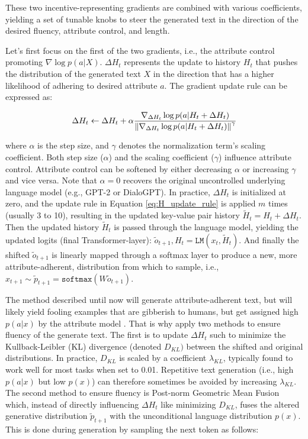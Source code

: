 These two incentive-representing gradients are combined with various coefficients, yielding a set of tunable knobs to steer the generated text in the direction of the desired fluency, attribute control, and length.

Let's first focus on the first of the two gradients, i.e., the attribute control promoting $\nabla \log p(a | X)$. $\Delta H_t$ represents the update to history $H_t$ that pushes the distribution of the generated text $X$ in the direction that has a higher likelihood of adhering to desired attribute $a$. The gradient update rule can be expressed as:

\begin{equation}
    \Delta H_t \leftarrow \Delta H_t + \alpha
    \frac{\nabla_{\Delta H_t} \log p(a | H_t + \Delta H_t)}
    {\norm{\nabla_{\Delta H_t} \log p(a | H_t + \Delta H_t)}^{\gamma}}
\label{eq:H_update_rule}
\end{equation}

where $\alpha$ is the step size, and $\gamma$ denotes the normalization term's scaling coefficient. Both step size ($\alpha$) and the scaling coefficient ($\gamma$) influence attribute control. Attribute control can be softened by either decreasing $\alpha$ or increasing $\gamma$ and vice versa. Note that $\alpha = 0$ recovers the original uncontrolled underlying language model (e.g., GPT-2 or DialoGPT). In practice, $\Delta H_t$ is initialized at zero, and the update rule in Equation \ref{eq:H_update_rule} is applied $m$ times (usually 3 to 10), resulting in the updated key-value pair history $\tilde{H}_t  = H_t + \Delta H_t$. Then the updated history $\tilde{H}_t$ is passed through the language model, yielding the updated logits (final Transformer-layer): $\tilde{o}_{t + 1}, H_t = \texttt{LM}(x_t, \tilde{H}_t)$. And finally the shifted $\tilde{o}_{t + 1}$ is linearly mapped through a softmax layer to produce a new, more attribute-adherent, distribution from which to sample, i.e., $x_{t + 1} \sim \tilde{p}_{t + 1} = \texttt{softmax} \left( W \tilde{o}_{t + 1} \right)$.

The method described until now will generate attribute-adherent text, but will likely yield fooling examples \citep{nguyen2015deep} that are gibberish to humans, but get assigned high $p(a | x)$ by the attribute model \citep{dathathri2019plug}. That is why \cite{dathathri2019plug} apply two methods to ensure fluency of the generate text. The first is to update $\Delta H_t$ such to minimize the Kullback-Leibler (KL) divergence (denoted $D_{KL})$ between the shifted and original distributions. In practice, $D_{KL}$ is scaled by a coefficient $\lambda_{KL}$, typically found to work well for most tasks when set to 0.01. Repetitive text generation (i.e., high $p(a | x)$ but low $p(x)$) can therefore sometimes be avoided by increasing $\lambda_{KL}$. The second method to ensure fluency is Post-norm Geometric Mean Fusion \citep{stahlberg-etal-2018-simple} which, instead of directly influencing $\Delta H_t$ like minimizing $D_{KL}$, fuses the altered generative distribution $\tilde{p}_{t + 1}$ with the unconditional language distribution $p(x)$. This is done during generation by sampling the next token as follows:

